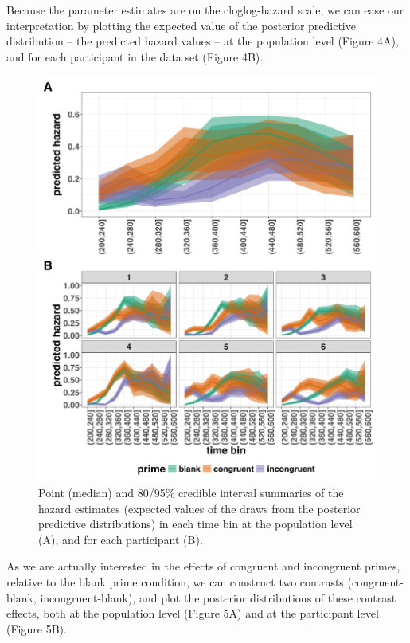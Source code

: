 \documentclass[
  man, donotrepeattitle,floatsintext]{apa6}
\begin{document}
Because the parameter estimates are on the cloglog-hazard scale, we can ease our interpretation by plotting the expected value of the posterior predictive distribution -- the predicted hazard values -- at the population level (Figure 4A), and for each participant in the data set (Figure 4B).



\begin{figure}[H]

{\centering \includegraphics[width=0.8\linewidth,height=0.67\textheight,]{../Tutorial_2_Bayesian/figures/M1i_pred_combined} 

}

\caption{Point (median) and 80/95\% credible interval summaries of the hazard estimates (expected values of the draws from the posterior predictive distributions) in each time bin at the population level (A), and for each participant (B).}\label{fig:plot-pred-grand-effects}
\end{figure}

As we are actually interested in the effects of congruent and incongruent primes, relative to the blank prime condition, we can construct two contrasts (congruent-blank, incongruent-blank), and plot the posterior distributions of these contrast effects, both at the population level (Figure 5A) and at the participant level (Figure 5B).
\end{document}
